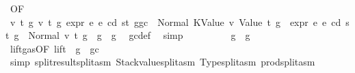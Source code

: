 \begin{isabellebody}
\ {}{}{\isacharparenleft}{\kern0pt}{}{\isacharparenright}{\kern0pt}{\isacharbrackleft}{\kern0pt}OF\ {\isacharasterisk}{\kern0pt}\ {\isacharasterisk}{\kern0pt}{\isacharasterisk}{\kern0pt}\ {\isacharasterisk}{\kern0pt}{\isacharasterisk}{\kern0pt}{\isacharasterisk}{\kern0pt}{\isacharbrackright}{\kern0pt}\ \isamarkupfalse%
\ {\isachardoublequoteopen}{\isasymAnd}v\ t\ g{\isacharprime}{\kern0pt}\ v{\isacharprime}{\kern0pt}\ t{\isacharprime}{\kern0pt}\ g{\isacharprime}{\kern0pt}{\isacharprime}{\kern0pt}{\isachardot}{\kern0pt}\ expr\ e{}\ e\ cd\ st\ {\isacharparenleft}{\kern0pt}g{\isacharminus}{\kern0pt}gc{\isacharparenright}{\kern0pt}\ {\isacharequal}{\kern0pt}\ Normal\ {\isacharparenleft}{\kern0pt}{\isacharparenleft}{\kern0pt}KValue\ v{\isacharcomma}{\kern0pt}\ Value\ t{\isacharparenright}{\kern0pt}{\isacharcomma}{\kern0pt}\ g{\isacharprime}{\kern0pt}{\isacharparenright}{\kern0pt}\ {\isasymLongrightarrow}\ expr\ e{}\ e\ cd\ st\ g{\isacharprime}{\kern0pt}\ {\isacharequal}{\kern0pt}\ Normal\ {\isacharparenleft}{\kern0pt}{\isacharparenleft}{\kern0pt}v{\isacharprime}{\kern0pt}{\isacharcomma}{\kern0pt}\ t{\isacharprime}{\kern0pt}{\isacharparenright}{\kern0pt}{\isacharcomma}{\kern0pt}\ g{\isacharprime}{\kern0pt}{\isacharprime}{\kern0pt}{\isacharparenright}{\kern0pt}\ {\isasymLongrightarrow}\ g{\isacharprime}{\kern0pt}{\isacharprime}{\kern0pt}\ {\isasymle}\ g{\isacharprime}{\kern0pt}{\isachardoublequoteclose}\ \isamarkupfalse%
\ gc{\isacharunderscore}{\kern0pt}def\ \isamarkupfalse%
\ simp\isanewline
\ \ \ \ \ \ \isamarkupfalse%
\ \isamarkupfalse%
\ {\isachardoublequoteopen}g{}\ {\isasymle}\ g{\isachardoublequoteclose}\ \isamarkupfalse%
\ lift{\isacharunderscore}{\kern0pt}gas{\isacharbrackleft}{\kern0pt}OF\ lift{\isacharbrackright}{\kern0pt}\ {\isacharbackquoteopen}{\isasymnot}\ g\ {\isasymle}\ gc{\isacharbackquoteclose}\ \isamarkupfalse%
\ {\isacharparenleft}{\kern0pt}simp\ split{\isacharcolon}{\kern0pt}result{\isachardot}{\kern0pt}split{\isacharunderscore}{\kern0pt}asm\ Stackvalue{\isachardot}{\kern0pt}split{\isacharunderscore}{\kern0pt}asm\ Type{\isachardot}{\kern0pt}split{\isacharunderscore}{\kern0pt}asm\ prod{\isachardot}{\kern0pt}split{\isacharunderscore}{\kern0pt}asm{\isacharparenright}{\kern0pt}\isanewline
\ \ \ \ \isamarkupfalse%
\isanewline
\ \ \isamarkupfalse%
\isanewline
{}\isamarkupfalse%
\isanewline
\ \ \isamarkupfalse%

\end{isabellebody}
